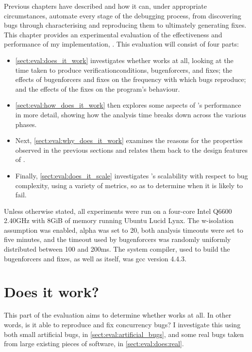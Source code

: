 Previous chapters have described {\technique} and how it can, under
appropriate circumstances, automate every stage of the debugging
process, from discovering bugs through characterising and reproducing
them to ultimately generating fixes.  This chapter provides an
experimental evaluation of the effectiveness and performance of my
implementation, {\implementation}.  This evaluation will consist of
four parts:
\begin{itemize}
\item \autoref{sect:eval:does_it_work} investigates whether
  {\technique} works at all, looking at the time taken to produce
  \glspl{verificationcondition}, \glspl{bugenforcer}, and fixes; the
  effects of \glspl{bugenforcer} and fixes on the frequency with which
  bugs reproduce; and the effects of the fixes on the program's
  behaviour.
\item \autoref{sect:eval:how_does_it_work} then explores some aspects
  of {\technique}'s performance in more detail, showing how the
  analysis time breaks down across the various phases.
\item Next, \autoref{sect:eval:why_does_it_work} examines the reasons
  for the properties observed in the previous sections and relates
  them back to the design features of {\technique}.
\item Finally, \autoref{sect:eval:does_it_scale} investigates
  {\technique}'s scalability with respect to bug complexity, using a
  variety of metrics, so as to determine when it is likely to fail.
\end{itemize}
Unless otherwise stated, all experiments were run on a four-core Intel
Q6600 2.40GHz with 8GiB of memory running Ubuntu Lucid Lynx.  The
\gls{w-isolation} assumption was enabled, \gls{alpha} was set to 20,
both analysis timeouts were set to five minutes, and the timeout used
by \glspl{bugenforcer} was randomly uniformly distributed between 100
and 200ms.  The system compiler, used to build the \glspl{bugenforcer}
and fixes, as well as {\implementation} itself, was gcc version 4.4.3.

\section{Does it work?}
\label{sect:eval:does_it_work}

This part of the evaluation aims to determine whether {\technique}
works at all.  In other words, is it able to reproduce and fix
concurrency bugs?  I investigate this using both small artificial
bugs, in \autoref{sect:eval:artificial_bugs}, and some real bugs taken
from large existing pieces of software, in
\autoref{sect:eval:does:real}.

